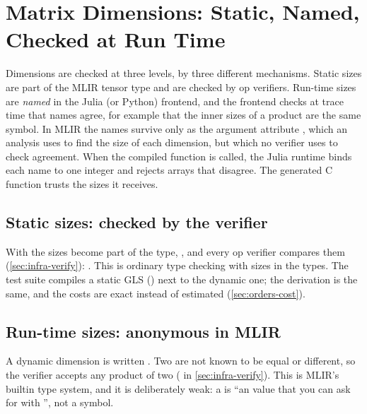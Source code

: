 \chapter{Matrix Dimensions: Static, Named, Checked at Run Time}
\label{ch:shapes}

\begin{answer}
Dimensions are checked at three levels, by three different mechanisms.
Static sizes are part of the MLIR tensor type and are checked by op
verifiers. Run-time sizes are \emph{named} in the Julia (or Python)
frontend, and the frontend checks at trace time that names agree, for
example that the inner sizes of a product are the same symbol. In MLIR the
names survive only as the argument attribute , which an
analysis uses to find the size of each dimension, but which no verifier uses
to check agreement. When the compiled function is called, the Julia runtime
binds each name to one integer and rejects arrays that disagree. The
generated C function trusts the sizes it receives.
\end{answer}

\section{Static sizes: checked by the verifier}
\label{sec:shapes-static}

With  the sizes become part of the type,
, and every op verifier compares them
(\cref{sec:infra-verify}): . This is ordinary type checking with sizes in the types. The test
suite compiles a static GLS () next to the dynamic one; the
derivation is the same, and the costs are exact instead of estimated
(\cref{sec:orders-cost}).

\section{Run-time sizes: anonymous in MLIR}
\label{sec:shapes-anon}

A dynamic dimension is written . Two  are not known to be
equal or different, so the verifier accepts any product of two
 ( in \cref{sec:infra-verify}). This is
MLIR's builtin type system, and it is deliberately weak: a  is ``an
 value that you can ask for with '', not a
symbol.

